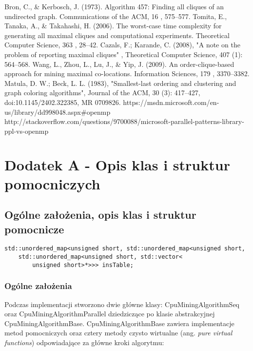 \documentclass[12pt]{article}
\begin{document}
\begin{thebibliography}{}
Bron, C., \& Kerbosch, J. (1973). Algorithm 457: Finding all cliques of an undirected graph. Communications of the ACM, 16 , 575–577.
Tomita, E., Tanaka, A., \& Takahashi, H. (2006). The worst-case time complexity for
generating all maximal cliques and computational experiments. Theoretical Computer Science, 363 , 28–42.
Cazals, F.; Karande, C. (2008), "A note on the problem of reporting maximal cliques" , Theoretical Computer Science, 407 (1): 564–568.
Wang, L., Zhou, L., Lu, J., \& Yip, J. (2009). An order-clique-based approach for mining maximal co-locations. Information Sciences, 179 , 3370–3382.
Matula, D. W.; Beck, L. L. (1983), "Smallest-last ordering and clustering and graph coloring algorithms", Journal of the ACM, 30 (3): 417–427, doi:10.1145/2402.322385, MR 0709826.
https://msdn.microsoft.com/en-us/library/dd998048.aspx\#openmp
http://stackoverflow.com/questions/9700088/microsoft-parallel-patterns-library-ppl-vs-openmp
\end{thebibliography}

\newpage

\appendix

\section{Dodatek A - Opis klas i struktur pomocniczych}

\subsection{Ogólne założenia, opis klas i struktur pomocnicze}

\begin{lstlisting}
std::unordered_map<unsigned short, std::unordered_map<unsigned short,
	std::unordered_map<unsigned short, std::vector<
    	unsigned short>*>>> insTable;
\end{lstlisting}

\subsubsection{Ogólne założenia}
Podczas implementacji stworzono dwie główne klasy: CpuMiningAlgorithmSeq oraz CpuMiningAlgorithmParallel dziedziczące po klasie abstrakcyjnej CpuMiningAlgorithmBase. CpuMiningAlgorithmBase zawiera implementacje metod pomocniczych oraz cztery metody czysto wirtualne (ang. \textit{pure virtual functions}) odpowiadające za główne kroki algorytmu:
\end{document}
